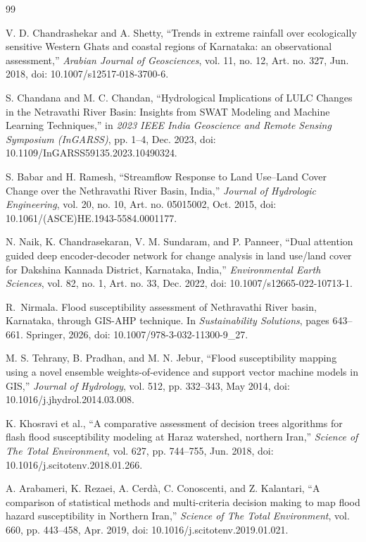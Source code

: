 \begin{thebibliography}{99}
\setlength{\itemsep}{0pt}

V. D. Chandrashekar and A. Shetty, ``Trends in extreme rainfall over ecologically sensitive Western Ghats and coastal regions of Karnataka: an observational assessment,'' \emph{Arabian Journal of Geosciences}, vol. 11, no. 12, Art. no. 327, Jun. 2018, doi: 10.1007/s12517-018-3700-6.

S. Chandana and M. C. Chandan, ``Hydrological Implications of LULC Changes in the Netravathi River Basin: Insights from SWAT Modeling and Machine Learning Techniques,'' in \emph{2023 IEEE India Geoscience and Remote Sensing Symposium (InGARSS)}, pp. 1--4, Dec. 2023, doi: 10.1109/InGARSS59135.2023.10490324.

S. Babar and H. Ramesh, ``Streamflow Response to Land Use--Land Cover Change over the Nethravathi River Basin, India,'' \emph{Journal of Hydrologic Engineering}, vol. 20, no. 10, Art. no. 05015002, Oct. 2015, doi: 10.1061/(ASCE)HE.1943-5584.0001177.

N. Naik, K. Chandrasekaran, V. M. Sundaram, and P. Panneer, ``Dual attention guided deep encoder-decoder network for change analysis in land use/land cover for Dakshina Kannada District, Karnataka, India,'' \emph{Environmental Earth Sciences}, vol. 82, no. 1, Art. no. 33, Dec. 2022, doi: 10.1007/s12665-022-10713-1.

R.~Nirmala. Flood susceptibility assessment of Nethravathi River basin, Karnataka, through GIS-AHP technique. In \emph{Sustainability Solutions}, pages 643--661. Springer, 2026, doi: 10.1007/978-3-032-11300-9\_27.

M. S. Tehrany, B. Pradhan, and M. N. Jebur, ``Flood susceptibility mapping using a novel ensemble weights-of-evidence and support vector machine models in GIS,'' \emph{Journal of Hydrology}, vol. 512, pp. 332--343, May 2014, doi: 10.1016/j.jhydrol.2014.03.008.

K. Khosravi et al., ``A comparative assessment of decision trees algorithms for flash flood susceptibility modeling at Haraz watershed, northern Iran,'' \emph{Science of The Total Environment}, vol. 627, pp. 744--755, Jun. 2018, doi: 10.1016/j.scitotenv.2018.01.266.

A. Arabameri, K. Rezaei, A. Cerdà, C. Conoscenti, and Z. Kalantari, ``A comparison of statistical methods and multi-criteria decision making to map flood hazard susceptibility in Northern Iran,'' \emph{Science of The Total Environment}, vol. 660, pp. 443--458, Apr. 2019, doi: 10.1016/j.scitotenv.2019.01.021.


\end{thebibliography}
